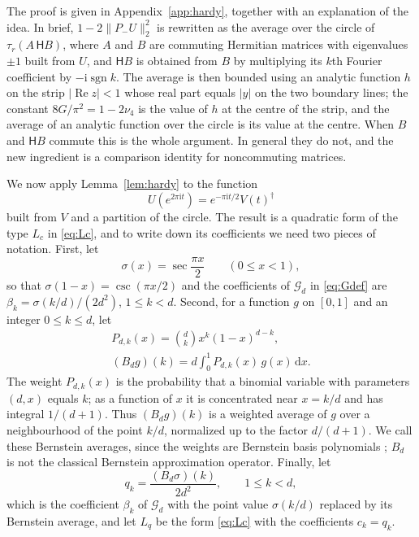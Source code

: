\documentclass[aps,prl,reprint,superscriptaddress,longbibliography,floatfix,raggedbottom]{revtex4-2}
\newcommand{\ii}{\mathrm i}
\newcommand{\dd}{\,\mathrm d}
\newcommand{\norm}[1]{\lVert #1\rVert}
\newcommand{\abs}[1]{\lvert #1\rvert}
\newcommand{\tr}{\tau}
\newcommand{\Gcat}{G}
\newcommand{\Gd}{\mathcal G_d}
\newcommand{\Hilb}{\mathsf H}
\begin{document}
The proof is given in Appendix~\ref{app:hardy}, together with an
explanation of the idea. In brief, $1-2\norm{P_-U}_2^2$ is rewritten
as the average over the circle of $\tr_r(A\,\Hilb B)$, where $A$ and
$B$ are commuting Hermitian matrices with eigenvalues $\pm1$ built
from $U$, and $\Hilb B$ is obtained from $B$ by multiplying its $k$th
Fourier coefficient by $-\ii\operatorname{sgn}k$. The average is then
bounded using an analytic function $h$ on the strip
$\abs{\operatorname{Re}z}<1$ whose real part equals $\abs y$ on the
two boundary lines; the constant $8\Gcat/\pi^2=1-2\nu_4$ is the value
of $h$ at the centre of the strip, and the average of an analytic
function over the circle is its value at the centre. When $B$ and
$\Hilb B$ commute this is the whole argument. In general they do not,
and the new ingredient is a comparison identity for noncommuting
matrices.

We now apply Lemma~\ref{lem:hardy} to the function
\[
U(e^{2\pi\ii t})=e^{-\pi\ii t/2}V(t)^\dagger
\]
built from $V$ and a
partition of the circle. The result is a quadratic form of the type
$L_c$ in \eqref{eq:Lc}, and to write down its coefficients we need two
pieces of notation. First, let
\[
\sigma(x)=\sec\frac{\pi x}2\qquad(0\le x<1),
\]
so that $\sigma(1-x)=\csc(\pi x/2)$ and the coefficients of $\Gd$ in
\eqref{eq:Gdef} are $\beta_k=\sigma(k/d)/(2d^2)$, $1\le k<d$.
Second, for a function $g$ on $[0,1]$ and an
integer $0\le k\le d$, let
\[
\begin{gathered}
P_{d,k}(x)=\binom{d}{k}x^k(1-x)^{d-k},\\
(B_dg)(k)=d\int_0^1P_{d,k}(x)\,g(x)\dd x .
\end{gathered}
\]
The weight $P_{d,k}(x)$ is the probability that a binomial variable
with parameters $(d,x)$ equals $k$; as a function of $x$ it is
concentrated near $x=k/d$ and has integral $1/(d+1)$. Thus
$(B_dg)(k)$ is a weighted average of $g$ over a neighbourhood of the
point $k/d$, normalized up to the factor $d/(d+1)$. We call these Bernstein averages, since the weights are Bernstein
basis polynomials \cite{Bernstein}; $B_d$ is not the classical
Bernstein approximation operator. Finally,
let
\begin{equation}\label{eq:Ddef}
q_k=\frac{(B_d\sigma)(k)}{2d^2},\qquad 1\le k<d,
\end{equation}
which is the coefficient $\beta_k$ of $\Gd$ with the point value
$\sigma(k/d)$ replaced by its Bernstein average, and let $L_q$ be the
form \eqref{eq:Lc} with the coefficients $c_k=q_k$.
\end{document}
